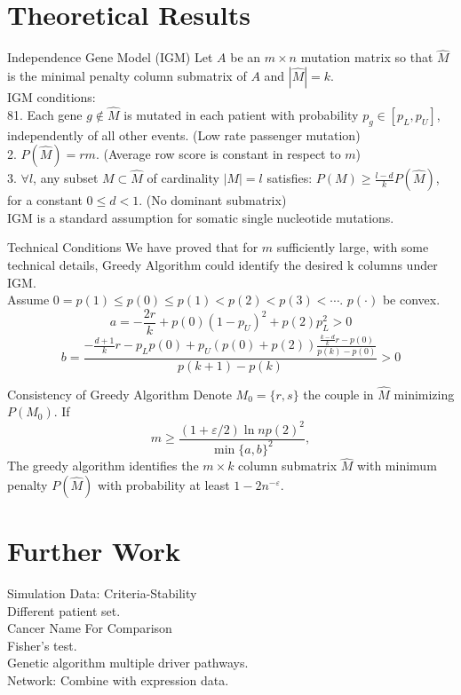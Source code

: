 \documentclass[xcolor=dvipsnames]{beamer}
\begin{document}
\section{Theoretical Results}
\begin{frame}{Independence Gene Model (IGM)}
Let $A$ be an $m\times n$ mutation matrix so that $\hat{M}$ is the minimal penalty column submatrix of $A$ and $|\hat{M}|=k$.\\
IGM conditions:\\
81. Each gene $g\notin \hat{M}$ is mutated in each patient with probability $p_g\in[p_L,p_U]$, independently of all other events. (Low rate passenger mutation)\\
2. $P(\hat{M})=rm$. (Average row score is constant in respect to $m$)\\
3. $\forall l$, any subset $M\subset \hat{M}$ of cardinality $|M|=l$ satisfies: $P(M)\geqslant \frac{l-d}{k}P(\hat{M})$, for a constant $0\leqslant d<1$. (No dominant submatrix)\\
IGM is a standard assumption for somatic single nucleotide mutations.\\
\end{frame}
\begin{frame}{Technical Conditions}
We have proved that for $m$ sufficiently large, with some technical details, Greedy Algorithm could identify the desired k columns under IGM.\\
Assume $0=p(1)\leqslant p(0)\leqslant p(1)<p(2)<p(3)<\cdots$. $p(\cdot)$ be convex.\\
\[a=-\frac{2r}{k}+p(0)(1-p_U)^2+p(2)p_L^2>0\]
\[b=\frac{-\frac{d+1}{k}r-p_Lp(0)+p_U(p(0)+p(2))\frac{\frac{k-d}{k}r-p(0)}{p(k)-p(0)}}{p(k+1)-p(k)}>0\]
\end{frame}
\begin{frame}{Consistency of Greedy Algorithm}
Denote $M_0=\{r,s\}$ the couple in $\hat{M}$ minimizing $P(M_0)$. If
\[
m\geqslant \frac{(1+\varepsilon/2)\ln{n}p(2)^2}{\min{\{a,b\}}^2},
\]
The greedy algorithm identifies the $m\times k$ column submatrix $\hat{M}$ with minimum penalty $P(\hat{M})$ with probability at least $1-2n^{-\varepsilon}$.\\
\end{frame}
\section{Further Work}
\begin{frame}
Simulation Data: Criteria-Stability\\
Different patient set.\\
Cancer Name For Comparison\\
Fisher's test.\\
Genetic algorithm multiple driver pathways.\\
Network: Combine with expression data.\\
\end{frame}
\end{document}
